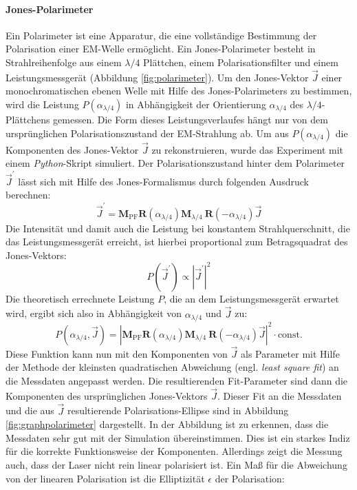 \documentclass[titlepage,  ngerman]{article}
\begin{document}
	\paragraph{Jones-Polarimeter}
	Ein Polarimeter ist eine Apparatur, die eine vollständige Bestimmung der Polarisation einer EM-Welle ermöglicht. Ein Jones-Polarimeter besteht in Strahlreihenfolge aus einem $\lambda / 4$ Plättchen, einem Polarisationsfilter und einem Leistungsmessgerät (Abbildung \ref{fig:polarimeter}). Um den Jones-Vektor $\vec{J}$ einer monochromatischen ebenen Welle mit Hilfe des Jones-Polarimeters zu bestimmen, wird die Leistung $P(\alpha_{\lambda/4})$ in Abhängigkeit der Orientierung $\alpha_{\lambda/4}$ des $\lambda / 4$-Plättchens gemessen. Die Form dieses Leistungsverlaufes hängt nur von dem ursprünglichen Polarisationszustand der EM-Strahlung ab. Um aus $P(\alpha_{\lambda/4})$ die Komponenten des Jones-Vektor $\vec{J}$ zu rekonstruieren, wurde das Experiment mit einem \textit{Python}-Skript simuliert. Der Polarisationszustand hinter dem Polarimeter $\vec{J}^\prime$ lässt sich mit Hilfe des Jones-Formalismus durch folgenden Ausdruck berechnen:
	\begin{equation}
		\vec{J}^\prime = \boldsymbol{M}_\mathrm{PF} \boldsymbol{R}(\alpha_{\lambda/4})\boldsymbol{M}_{\lambda / 4}\ \boldsymbol{R}(-\alpha_{\lambda/4})\vec{J}
	\end{equation}
	Die Intensität und damit auch die Leistung bei konstantem Strahlquerschnitt, die das Leistungsmessgerät erreicht, ist hierbei proportional zum Betragsquadrat des Jones-Vektors:
	\begin{equation}
		P(\vec{J}^\prime) \propto \left|\vec{J}^\prime\right|^2
	\end{equation}
	Die theoretisch errechnete Leistung $P$, die an dem Leistungsmessgerät erwartet wird, ergibt sich also in Abhängigkeit von $\alpha_{\lambda/4}$ und $\vec{J}$ zu:
	\begin{equation}
		P(\alpha_{\lambda/4}, \vec{J}) = \left|\boldsymbol{M}_\mathrm{PF} \boldsymbol{R}(\alpha_{\lambda/4})\boldsymbol{M}_{\lambda / 4}\ \boldsymbol{R}(-\alpha_{\lambda/4})\vec{J}\right|^2 \cdot \mathrm{const.}
		\label{eq:simulation_polarimeter}
	\end{equation}
	Diese Funktion kann nun mit den Komponenten von $\vec{J}$ als Parameter mit Hilfe der Methode der kleinsten quadratischen Abweichung (engl. \textit{least square fit}) an die Messdaten angepasst werden. Die resultierenden Fit-Parameter sind dann die Komponenten des ursprünglichen Jones-Vektors $\vec{J}$. Dieser Fit an die Messdaten und die aus $\vec{J}$ resultierende Polarisations-Ellipse sind in Abbildung \ref{fig:graphpolarimeter} dargestellt. In der Abbildung ist zu erkennen, dass die Messdaten sehr gut mit der Simulation übereinstimmen. Dies ist ein starkes Indiz für die korrekte Funktionsweise der Komponenten. Allerdings zeigt die Messung auch, dass der Laser nicht rein linear polarisiert ist. Ein Maß für die Abweichung von der linearen Polarisation ist die Elliptizität $\epsilon$ der Polarisation:
\end{document}
